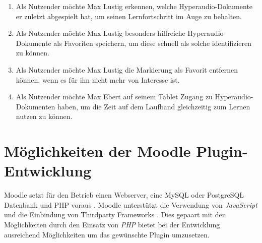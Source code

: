\begin{enumerate}[label=US-\arabic*:,ref=US-\arabic*]
\item \label{US-Uebersicht-Letzte} Als Nutzender möchte Max Lustig erkennen, welche Hyperaudio-Dokumente er zuletzt abgespielt hat, um seinen Lernfortschritt im Auge zu behalten.

\item \label{US-Favoriten} Als Nutzender möchte Max Lustig besonders hilfreiche Hyperaudio-Dokumente als Favoriten speichern, um diese schnell als solche identifizieren zu können.

\item \label{US-Favoriten-Loeschen} Als Nutzender möchte Max Lustig die Markierung als Favorit entfernen können, wenn es für ihn nicht mehr von Interesse ist.

\item \label{US-Zeit-Mobil} Als Nutzender möchte Max Ebert auf seinem Tablet Zugang zu Hyperaudio-Dokumenten haben, um die Zeit auf dem Laufband gleichzeitig zum Lernen nutzen zu können.

\end{enumerate}


%
%
%
%




\section{Möglichkeiten der Moodle Plugin-Entwicklung}
Moodle setzt für den Betrieb einen Webserver, eine MySQL oder PostgreSQL Datenbank und PHP voraus . Moodle unterstützt die Verwendung von \textit{JavaScript} und die Einbindung von Thirdparty Frameworks \citep{wild2017moodle}. Dies gepaart mit den Möglichkeiten durch den Einsatz von \textit{PHP} bietet bei der Entwicklung ausreichend Möglichkeiten um das gewünschte Plugin umzusetzen.

